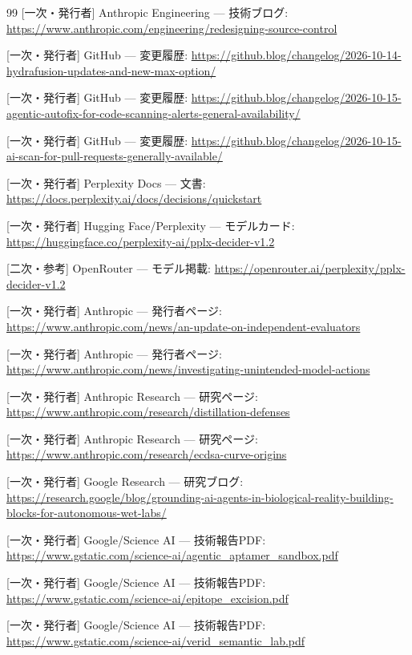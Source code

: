 \documentclass[lualatex,a4paper,10pt]{jlreq}
\begin{document}
\begin{thebibliography}{99}
 [一次・発行者] Anthropic Engineering — 技術ブログ: \url{https://www.anthropic.com/engineering/redesigning-source-control}

 [一次・発行者] GitHub — 変更履歴: \url{https://github.blog/changelog/2026-10-14-hydrafusion-updates-and-new-max-option/}

 [一次・発行者] GitHub — 変更履歴: \url{https://github.blog/changelog/2026-10-15-agentic-autofix-for-code-scanning-alerts-general-availability/}

 [一次・発行者] GitHub — 変更履歴: \url{https://github.blog/changelog/2026-10-15-ai-scan-for-pull-requests-generally-available/}

 [一次・発行者] Perplexity Docs — 文書: \url{https://docs.perplexity.ai/docs/decisions/quickstart}

 [一次・発行者] Hugging Face/Perplexity — モデルカード: \url{https://huggingface.co/perplexity-ai/pplx-decider-v1.2}

 [二次・参考] OpenRouter — モデル掲載: \url{https://openrouter.ai/perplexity/pplx-decider-v1.2}

 [一次・発行者] Anthropic — 発行者ページ: \url{https://www.anthropic.com/news/an-update-on-independent-evaluators}

 [一次・発行者] Anthropic — 発行者ページ: \url{https://www.anthropic.com/news/investigating-unintended-model-actions}

 [一次・発行者] Anthropic Research — 研究ページ: \url{https://www.anthropic.com/research/distillation-defenses}

 [一次・発行者] Anthropic Research — 研究ページ: \url{https://www.anthropic.com/research/ecdsa-curve-origins}

 [一次・発行者] Google Research — 研究ブログ: \url{https://research.google/blog/grounding-ai-agents-in-biological-reality-building-blocks-for-autonomous-wet-labs/}

 [一次・発行者] Google/Science AI — 技術報告PDF: \url{https://www.gstatic.com/science-ai/agentic_aptamer_sandbox.pdf}

 [一次・発行者] Google/Science AI — 技術報告PDF: \url{https://www.gstatic.com/science-ai/epitope_excision.pdf}

 [一次・発行者] Google/Science AI — 技術報告PDF: \url{https://www.gstatic.com/science-ai/verid_semantic_lab.pdf}


\end{thebibliography}
\end{document}
